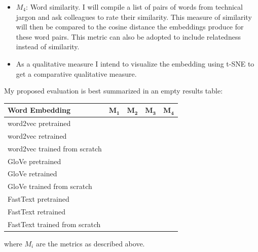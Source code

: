\documentclass[10pt,a4paper]{article}
\begin{document}
\begin{itemize}
	\item \textbf{$M_4$}: Word similarity. I will compile a list of pairs of words from technical jargon and ask colleagues to rate their similarity. This measure of similarity will then be compared to the cosine distance the embeddings produce for these word pairs. This metric can also be adopted to include relatedness instead of similarity.
	
	\item As a qualitative measure I intend to visualize the embedding using t-SNE \cite{vanDerMaaten2008} to get a comparative qualitative measure.
\end{itemize}
	
My proposed evaluation is best summarized in an empty results table:
	
		\begin{center}
			\begin{tabular}{|l| c| c| c|c|}
				\hline
				\textbf{Word Embedding} & $\boldsymbol{M_1}$ & $\boldsymbol{M_2}$ & $\boldsymbol{M_3}$ & $\boldsymbol{M_4}$\\ 
				\hline
				word2vec pretrained & \textbullet & \textbullet & \textbullet & \textbullet\\  \hline
			    word2vec retrained & \textbullet & \textbullet & \textbullet & \textbullet\\  	\hline
			    word2vec trained from scratch  & \textbullet & \textbullet & \textbullet & \textbullet\\  	\hline
			    GloVe pretrained & \textbullet & \textbullet & \textbullet & \textbullet\\  
			    \hline
			    GloVe retrained & \textbullet & \textbullet & \textbullet & \textbullet\\
			    \hline
			    GloVe trained from scratch  & \textbullet & \textbullet & \textbullet & \textbullet\\  	
			    \hline
			    FastText pretrained & \textbullet & \textbullet & \textbullet & \textbullet\\  \hline
			    FastText retrained & \textbullet & \textbullet & \textbullet & \textbullet\\  	\hline
			    FastText trained from scratch  & \textbullet & \textbullet & \textbullet & \textbullet\\  	
			    \hline
			    
				    
			\end{tabular}
		\end{center}
		
	where $M_i$ are the metrics as described above.
	
\end{document}
